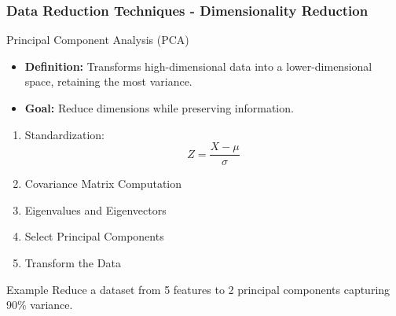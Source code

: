 \documentclass[aspectratio=169]{beamer}
\begin{document}
\begin{frame}[fragile]
    \frametitle{Data Reduction Techniques - Dimensionality Reduction}
    \begin{block}{Principal Component Analysis (PCA)}
        \begin{itemize}
            \item \textbf{Definition:} Transforms high-dimensional data into a lower-dimensional space, retaining the most variance.
            \item \textbf{Goal:} Reduce dimensions while preserving information.
        \end{itemize}

        \begin{enumerate}
            \item Standardization: 
            \begin{equation}
                Z = \frac{X - \mu}{\sigma}
            \end{equation}
            \item Covariance Matrix Computation
            \item Eigenvalues and Eigenvectors
            \item Select Principal Components
            \item Transform the Data
        \end{enumerate}
    \end{block}
    
    \begin{block}{Example}
        Reduce a dataset from 5 features to 2 principal components capturing 90\% variance.
    \end{block}
\end{frame}
\end{document}
